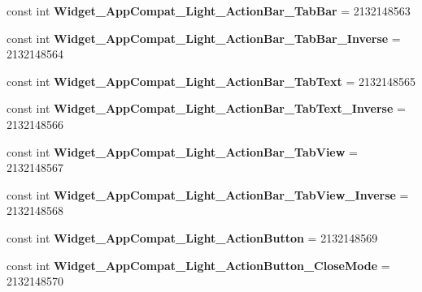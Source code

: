 \begin{DoxyCompactItemize}
\mbox{\label{classst_delivery_1_1_resource_1_1_style_a5ed8d8a338d6316226b03c68f6bd6290}} 
const int {\bfseries Widget\+\_\+\+App\+Compat\+\_\+\+Light\+\_\+\+Action\+Bar\+\_\+\+Tab\+Bar} = 2132148563
\item 
\mbox{\label{classst_delivery_1_1_resource_1_1_style_aeb27f9d2afe0664e546ab163de3c3dad}} 
const int {\bfseries Widget\+\_\+\+App\+Compat\+\_\+\+Light\+\_\+\+Action\+Bar\+\_\+\+Tab\+Bar\+\_\+\+Inverse} = 2132148564
\item 
\mbox{\label{classst_delivery_1_1_resource_1_1_style_aa16d0b7089e88370d341895bd3c3530c}} 
const int {\bfseries Widget\+\_\+\+App\+Compat\+\_\+\+Light\+\_\+\+Action\+Bar\+\_\+\+Tab\+Text} = 2132148565
\item 
\mbox{\label{classst_delivery_1_1_resource_1_1_style_a72dc3d9cf06e612f03ad6b897460dd8d}} 
const int {\bfseries Widget\+\_\+\+App\+Compat\+\_\+\+Light\+\_\+\+Action\+Bar\+\_\+\+Tab\+Text\+\_\+\+Inverse} = 2132148566
\item 
\mbox{\label{classst_delivery_1_1_resource_1_1_style_a2078b0d83ddc1bbdd7803bafb37c898a}} 
const int {\bfseries Widget\+\_\+\+App\+Compat\+\_\+\+Light\+\_\+\+Action\+Bar\+\_\+\+Tab\+View} = 2132148567
\item 
\mbox{\label{classst_delivery_1_1_resource_1_1_style_ace6139e4c738caa06475cd7062d93281}} 
const int {\bfseries Widget\+\_\+\+App\+Compat\+\_\+\+Light\+\_\+\+Action\+Bar\+\_\+\+Tab\+View\+\_\+\+Inverse} = 2132148568
\item 
\mbox{\label{classst_delivery_1_1_resource_1_1_style_a08dbaa073f630fe3ea27a027b7093411}} 
const int {\bfseries Widget\+\_\+\+App\+Compat\+\_\+\+Light\+\_\+\+Action\+Button} = 2132148569
\item 
\mbox{\label{classst_delivery_1_1_resource_1_1_style_a06b784d428cb4c0ba14d230ae8699e71}} 
const int {\bfseries Widget\+\_\+\+App\+Compat\+\_\+\+Light\+\_\+\+Action\+Button\+\_\+\+Close\+Mode} = 2132148570

\end{DoxyCompactItemize}
